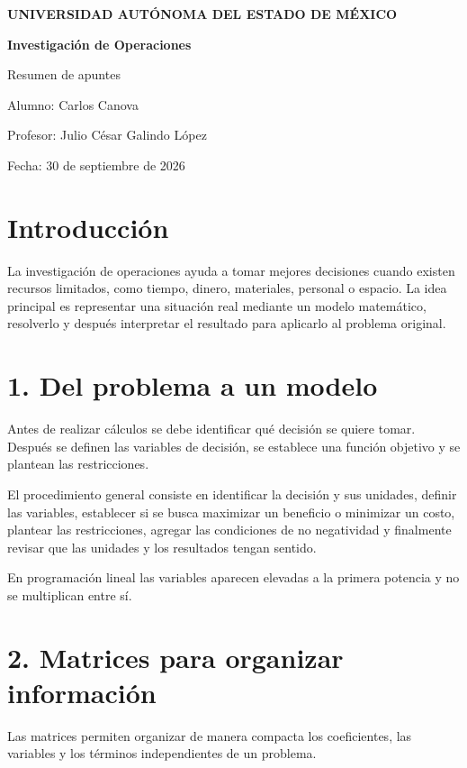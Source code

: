 \documentclass[12pt]{article}
\begin{document}
\begin{titlepage}
\centering
{\large\bfseries UNIVERSIDAD AUTÓNOMA DEL ESTADO DE MÉXICO\par}
\vspace{2cm}
{\LARGE\bfseries Investigación de Operaciones\par}
\vspace{0.7cm}
{\Large Resumen de apuntes\par}
\vfill
{\large Alumno: Carlos Canova\par}
\vspace{0.3cm}
{\large Profesor: Julio César Galindo López\par}
\vspace{0.3cm}
{\large Fecha: 30 de septiembre de 2026\par}
\vfill
\end{titlepage}
\section*{Introducción}
La investigación de operaciones ayuda a tomar mejores decisiones cuando existen recursos limitados, como tiempo, dinero, materiales, personal o espacio. La idea principal es representar una situación real mediante un modelo matemático, resolverlo y después interpretar el resultado para aplicarlo al problema original.

\section*{1. Del problema a un modelo}
Antes de realizar cálculos se debe identificar qué decisión se quiere tomar. Después se definen las variables de decisión, se establece una función objetivo y se plantean las restricciones.

El procedimiento general consiste en identificar la decisión y sus unidades, definir las variables, establecer si se busca maximizar un beneficio o minimizar un costo, plantear las restricciones, agregar las condiciones de no negatividad y finalmente revisar que las unidades y los resultados tengan sentido.

En programación lineal las variables aparecen elevadas a la primera potencia y no se multiplican entre sí.

\section*{2. Matrices para organizar información}
Las matrices permiten organizar de manera compacta los coeficientes, las variables y los términos independientes de un problema.
\end{document}
